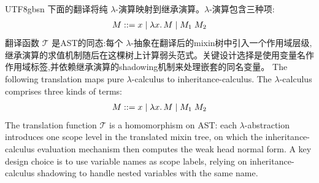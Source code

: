 \begin{CJK*}{UTF8}{gbsn}
%
\ifPaperChinese
下面的翻译将纯 $\lambda$-演算映射到继承演算。$\lambda$-演算包含三种项:
\[
  \begin{array}{r@{\;::=\;}l}
    M & x \mid \lambda x.\, M \mid M_1\; M_2
  \end{array}
\]
翻译函数 $\mathcal{T}$ 是AST的同态:每个 $\lambda$-抽象在翻译后的mixin树中引入一个作用域层级,继承演算的求值机制随后在这棵树上计算弱头范式。关键设计选择是使用变量名作作用域标签,并依赖继承演算的shadowing机制来处理嵌套的同名变量。
\else
The following translation maps pure $\lambda$-calculus to
inheritance-calculus. The $\lambda$-calculus comprises three
kinds of terms:
\[
  \begin{array}{r@{\;::=\;}l}
    M & x \mid \lambda x.\, M \mid M_1\; M_2
  \end{array}
\]
The translation function $\mathcal{T}$ is a homomorphism on AST:
each $\lambda$-abstraction introduces one scope level in the
translated mixin tree, on which the inheritance-calculus evaluation
mechanism then computes the weak head normal form. A key design choice is to use variable
names as scope labels, relying on inheritance-calculus shadowing
to handle nested variables with the same name.
\fi


\end{CJK*}
